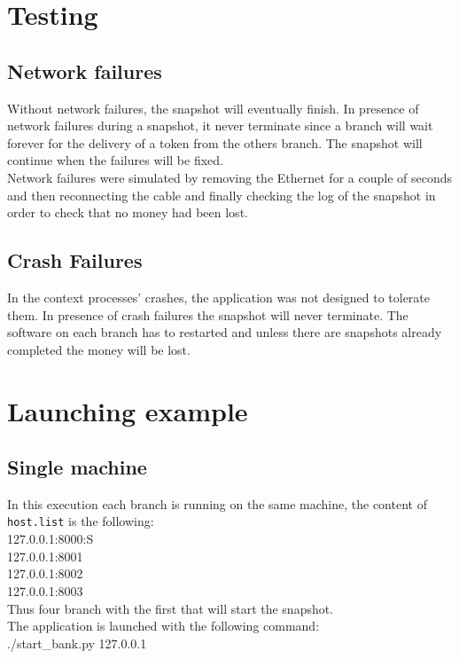 \documentclass{article}
\begin{document}
\section{Testing}
    \subsection{Network failures}
        Without network failures, the snapshot will eventually finish. In presence of network failures during a snapshot, it never terminate since a branch will wait forever for the delivery of a token from the others branch. The snapshot will continue when the failures will be fixed.\\
        Network failures were simulated by removing the Ethernet for a couple of seconds and then reconnecting the cable and finally checking the log of the snapshot in order to check that no money had been lost.
    \subsection{Crash Failures}
        In the context processes’ crashes, the application was not designed to tolerate them.
        In presence of crash failures the snapshot will never terminate. The software on each branch has to restarted and unless there are snapshots already completed the money will be lost.

\section{Launching example}
        \subsection{Single machine}
        In this execution each branch is running on the same machine, the content of \texttt{host.list} is the following:\\
        127.0.0.1:8000:S\\
        127.0.0.1:8001\\
        127.0.0.1:8002\\
        127.0.0.1:8003\\
        Thus four branch with the first that will start the snapshot.\\
        The application is launched with the following command:\\
        ./start\_bank.py 127.0.0.1\\
\end{document}
